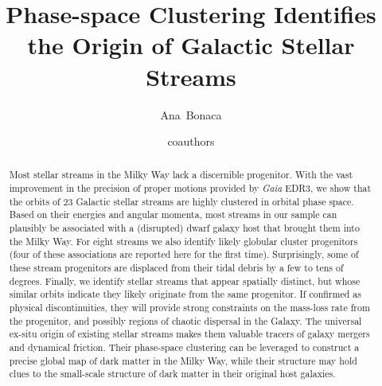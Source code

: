 \documentclass[twocolumn]{aastex63}
\begin{document}
\sloppy\sloppypar\raggedbottom\frenchspacing %

\title{Phase-space Clustering Identifies the Origin of Galactic Stellar Streams}


\author[0000-0002-7846-9787]{Ana~Bonaca}

\author{coauthors}



\begin{abstract}\noindent %
Most stellar streams in the Milky Way lack a discernible progenitor.
With the vast improvement in the precision of proper motions provided by {\it Gaia} EDR3, we show that the orbits of 23 Galactic stellar streams are highly clustered in orbital phase space.
Based on their energies and angular momenta, most streams in our sample can plausibly be associated with a (disrupted) dwarf galaxy host that brought them into the Milky Way.
For eight streams we also identify likely globular cluster progenitors (four of these associations are reported here for the first time).
Surprisingly, some of these stream progenitors are displaced from their tidal debris by a few to tens of degrees.
Finally, we identify stellar streams that appear spatially distinct, but whose similar orbits indicate they likely originate from the same progenitor.
If confirmed as physical discontinuities, they will provide strong constraints on the mass-loss rate from the progenitor, and possibly regions of chaotic dispersal in the Galaxy.
The universal ex-situ origin of existing stellar streams makes them valuable tracers of galaxy mergers and dynamical friction.
Their phase-space clustering can be leveraged to construct a precise global map of dark matter in the Milky Way, while their structure may hold clues to the small-scale structure of dark matter in their original host galaxies.
\end{abstract}
\end{document}
